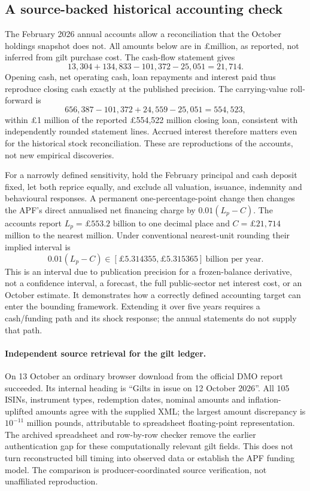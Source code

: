 \subsection{A source-backed historical accounting check}
The February 2026 annual accounts allow a reconciliation that the October holdings snapshot does not. All amounts below are in \pounds million, as reported, not inferred from gilt purchase cost. The cash-flow statement gives
\[
13{,}304+134{,}833-101{,}372-25{,}051=21{,}714.
\]
Opening cash, net operating cash, loan repayments and interest paid thus reproduce closing cash exactly at the published precision. The carrying-value roll-forward is
\[
656{,}387-101{,}372+24{,}559-25{,}051=554{,}523,
\]
within \pounds1 million of the reported \pounds554,522 million closing loan, consistent with independently rounded statement lines. Accrued interest therefore matters even for the historical stock reconciliation. These are reproductions of the accounts, not new empirical discoveries.

For a narrowly defined sensitivity, hold the February principal and cash deposit fixed, let both reprice equally, and exclude all valuation, issuance, indemnity and behavioural responses. A permanent one-percentage-point change then changes the APF's direct annualised net financing charge by $0.01(L_p-C)$. The accounts report $L_p=\pounds553.2$ billion to one decimal place and $C=\pounds21{,}714$ million to the nearest million. Under conventional nearest-unit rounding their implied interval is
\[
0.01(L_p-C)\in[\pounds5.314355,\pounds5.315365]\ \text{billion per year}.
\]
This is an interval due to publication precision for a frozen-balance derivative, not a confidence interval, a forecast, the full public-sector net interest cost, or an October estimate. It demonstrates how a correctly defined accounting target can enter the bounding framework. Extending it over five years requires a cash/funding path and its shock response; the annual statements do not supply that path.

\paragraph{Independent source retrieval for the gilt ledger.} On 13 October an ordinary browser download from the official DMO report succeeded. Its internal heading is ``Gilts in issue on 12 October 2026''. All 105 ISINs, instrument types, redemption dates, nominal amounts and inflation-uplifted amounts agree with the supplied XML; the largest amount discrepancy is $10^{-11}$ million pounds, attributable to spreadsheet floating-point representation. The archived spreadsheet and row-by-row checker remove the earlier authentication gap for these computationally relevant gilt fields. This does not turn reconstructed bill timing into observed data or establish the APF funding model. The comparison is producer-coordinated source verification, not unaffiliated reproduction.
